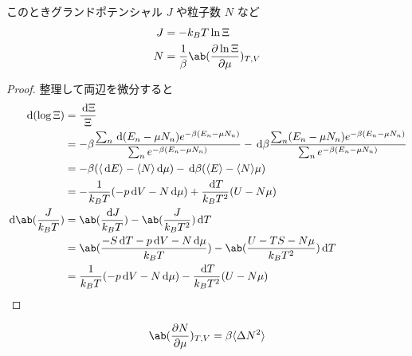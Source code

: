 \documentclass[a4paper,11pt]{jlreq}
\begin{document}
\begin{theorem}
  このときグランドポテンシャル $J$ や粒子数 $N$ など
  \begin{align}
    J & = -k_BT\ln\Xi                                   \\
    N & = \frac{1}{\beta}\ab(\diffp{\ln\Xi}{\mu})_{T,V}
  \end{align}
\end{theorem}
\begin{proof}
  整理して両辺を微分すると
  \begin{align}
    \dl{(\log\Xi)}           & = \frac{\dl{\Xi}}{\Xi}                                                                                                                                                                                         \\
                             & = -\beta\frac{\sum_{n}\dl{(E_n - \mu N_n)}e^{-\beta(E_n - \mu N_n)}}{\sum_{n}e^{-\beta(E_n - \mu N_n)}} - \dl{\beta}\frac{\sum_{n}(E_n - \mu N_n)e^{-\beta(E_n - \mu N_n)}}{\sum_{n}e^{-\beta(E_n - \mu N_n)}} \\
                             & = -\beta(\langle\dl{E}\rangle - \langle N\rangle\dl{\mu}) - \dl{\beta}(\langle E\rangle - \langle N\rangle\mu)                                                                                                 \\
                             & = -\frac{1}{k_BT}(-p\dl{V} - N\dl{\mu}) + \frac{\dl{T}}{k_BT^2}(U - N\mu)                                                                                                                                      \\
    \dl{\ab(\frac{J}{k_BT})} & = \ab(\frac{\dl{J}}{k_BT}) - \ab(\frac{J}{k_BT^2})\dl{T}                                                                                                                                                       \\
                             & = \ab(\frac{-S\dl{T} - p\dl{V} - N\dl{\mu}}{k_BT}) - \ab(\frac{U - TS - N\mu}{k_BT^2})\dl{T}                                                                                                                   \\
                             & = \frac{1}{k_BT}(-p\dl{V} - N\dl{\mu}) - \frac{\dl{T}}{k_BT^2}(U - N\mu)
  \end{align}

\end{proof}

\begin{theorem}[粒子数の揺らぎ]
  \begin{align}
    \ab(\diffp{N}{\mu})_{T,V} = \beta\langle\Delta N^2\rangle
  \end{align}
\end{theorem}
\end{document}
